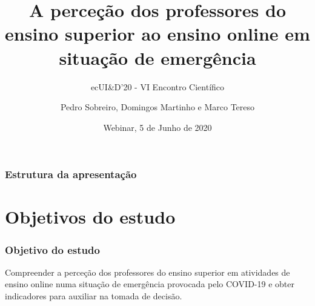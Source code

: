 \documentclass[10pt]{beamer}
\title[Perceção dos professores]{A perceção dos professores do ensino superior ao ensino online em situação de emergência}
\subtitle{ecUI{\&}D'20 - VI Encontro Científico}
\author{Pedro Sobreiro, Domingos Martinho e Marco Tereso} %
\institute[ecUI{\&}D'20] %
{ 
ISLA Santarém ~~~~~~~~~~~~~~~%
\medskip
\textit{pesobreiro@gmail.com} %
}
\date{Webinar, 5 de Junho de 2020} %
\begin{document}
\begin{frame}
	\titlepage %
\end{frame}

\begin{frame}
\frametitle{Estrutura da apresentação} %
\tableofcontents %

\end{frame}


\section{Objetivos do estudo} %
\begin{comment}
A investigação publicada sobre o envolvimento dos professores que normalmente desenvolvem a sua atividade em contexto presencial, em atividades de ensino online, não apresenta resultados consensuais. Na maioria das situações verifica-se que existem entre 30%
Apesar disso a situação de emergência provocada pela COVID-19 fez com que de um dia para o outro os docentes do ensino superior se tivessem confrontado com a necessidade, sem alternativa, de desenvolver a sua atividade em contexto online.
\end{comment}

\begin{frame}
	\frametitle{Objetivo do estudo}
	\Large{Compreender a perceção dos professores do ensino superior em atividades de ensino online numa situação de emergência provocada pelo COVID-19 e obter indicadores para auxiliar na tomada de decisão.}

	
\end{frame}
\end{document}
